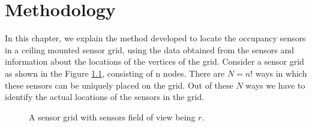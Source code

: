 \chapter{Methodology}
\label{chp:method}

In this chapter, we explain the method developed to locate the occupancy sensors in a ceiling mounted sensor grid, using the  data obtained from the sensors and  information about the locations of the vertices of the grid.
Consider a sensor grid as shown in the Figure \ref{fig:Grid}, consisting of n nodes. There are $N= n!$ ways in which these sensors can be uniquely placed on the grid. 
Out of these $N$ ways we have to identify the actual locations of the sensors in the grid.
\begin{figure}[!ht]
\centering
\caption{A sensor grid with sensors field of view being $ r$.}
\label{fig:Grid}
\end{figure}
